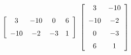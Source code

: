 {$\left[ \begin {array}{cccc} 3&-10&0&6\\\noalign{\medskip}-10&-2&-3&1
\end {array} \right] $}
{$\left[ \begin {array}{cc} 3&-10\\\noalign{\medskip}-10&-2
\\\noalign{\medskip}0&-3\\\noalign{\medskip}6&1\end {array} \right]$}

